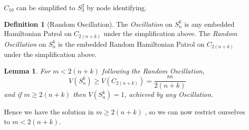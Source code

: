 \documentclass[a4paper,10pt]{article}
\newtheorem{lemma}[theorem]{Lemma}
\theoremstyle{definition}
\newtheorem{definition}[theorem]{Definition}
\theoremstyle{definition}
\theoremstyle{remark}
\theoremstyle{definition}
\begin{document}
\begin{myfigure}
\begin{center}
{
}
\end{center}
\caption{$C_{10}$ can be simplified to $S_{3}^{2}$ by node identifying.}
\end{myfigure}


\begin{definition}[Random Oscillation]
The \textit{Oscillation} on $S_{n}^{k}$ is any embedded Hamiltonian Patrol on $C_{2(n+k)}$ under the simplification above.
The \textit{Random Oscillation} on $S_{n}^{k}$ is the embedded Random Hamiltonian Patrol on $C_{2(n+k)}$ under the simplification above.
\end{definition}

\begin{lemma}
For $m < 2(n+k)$ following the Random Oscillation,
$$V(S_{n}^{k}) \geq V(C_{2(n+k)})=\frac{m}{2(n+k)}$$
and if $m \geq 2(n+k)$ then $V(S_{n}^{k})=1$, achieved by any Oscillation.
\end{lemma}

Hence we have the solution in $m \geq 2(n+k)$ , so we can now restrict ourselves to $m < 2(n+k)$.
\end{document}
